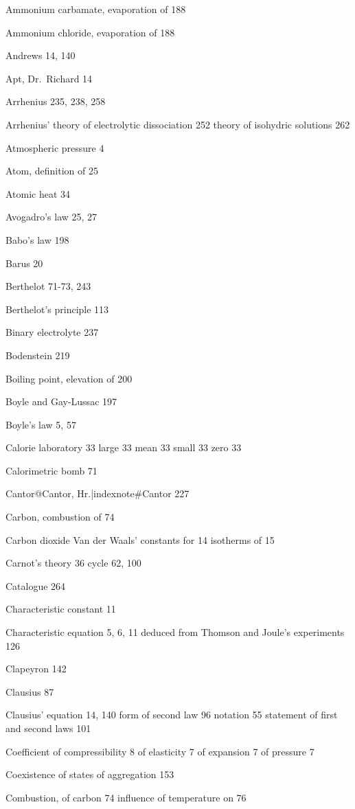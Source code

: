 \documentclass[12pt]{book}[2005/09/16]
\begin{document}
Ammonium carbamate, evaporation of 188

Ammonium chloride, evaporation of 188

Andrews 14, 140

Apt, Dr.\ Richard 14

Arrhenius 235, 238, 258

Arrhenius'
  theory of electrolytic dissociation 252
  theory of isohydric solutions 262

Atmospheric pressure 4

Atom, definition of 25

Atomic heat 34

Avogadro's law 25, 27



Babo's law 198

Barus 20

Berthelot 71-73, 243

Berthelot's principle 113

Binary electrolyte 237

Bodenstein 219

Boiling point, elevation of 200

Boyle and Gay-Lussac 197

Boyle's law 5, 57



Calorie
  laboratory 33
  large 33
  mean 33
  small 33
  zero 33

Calorimetric bomb 71

Cantor@Cantor, Hr.|indexnote#Cantor 227

Carbon, combustion of 74

Carbon dioxide
  Van der Waals' constants for 14
  isotherms of 15

Carnot's
  theory 36
  cycle 62, 100

Catalogue 264

Characteristic constant 11

Characteristic equation 5, 6, 11
  deduced from Thomson and Joule's experiments 126

Clapeyron 142

Clausius 87

Clausius' equation 14, 140
  form of second law 96
  notation 55
  statement of first and second laws 101

Coefficient
  of compressibility 8
  of elasticity 7
  of expansion 7
  of pressure 7

Coexistence of states of aggregation 153

Combustion, of carbon 74
  influence of temperature on 76
\end{document}
